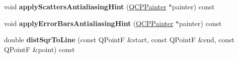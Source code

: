 \begin{DoxyCompactItemize}
\item 
\hypertarget{classQCPAbstractPlottable_a753272ee225a62827e90c3e1e78de4b1}{void {\bfseries apply\-Scatters\-Antialiasing\-Hint} (\hyperlink{classQCPPainter}{\-Q\-C\-P\-Painter} $\ast$painter) const }\label{classQCPAbstractPlottable_a753272ee225a62827e90c3e1e78de4b1}

\item 
\hypertarget{classQCPAbstractPlottable_af687bfe6160255960558eb71f1f81e73}{void {\bfseries apply\-Error\-Bars\-Antialiasing\-Hint} (\hyperlink{classQCPPainter}{\-Q\-C\-P\-Painter} $\ast$painter) const }\label{classQCPAbstractPlottable_af687bfe6160255960558eb71f1f81e73}

\item 
\hypertarget{classQCPAbstractPlottable_a5ea1cab44ca912dcdc96ed81ec5bed5d}{double {\bfseries dist\-Sqr\-To\-Line} (const \-Q\-Point\-F \&start, const \-Q\-Point\-F \&end, const \-Q\-Point\-F \&point) const }\label{classQCPAbstractPlottable_a5ea1cab44ca912dcdc96ed81ec5bed5d}

\end{DoxyCompactItemize}
